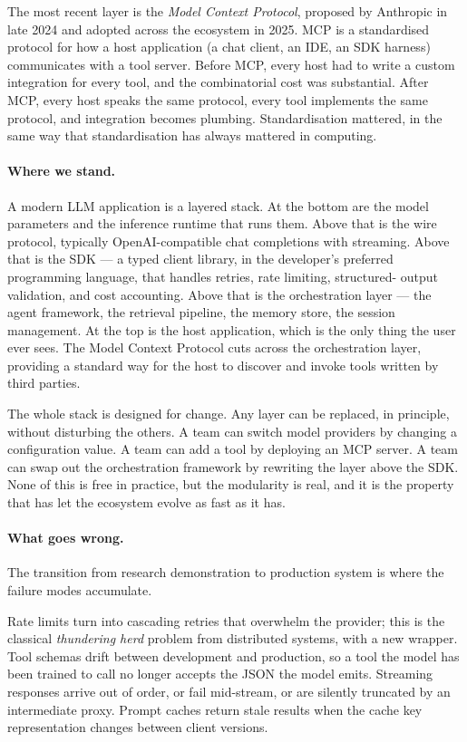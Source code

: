 The most recent layer is the \emph{Model Context Protocol},
proposed by Anthropic in late 2024 and adopted across the
ecosystem in 2025. MCP is a standardised protocol for how a
host application (a chat client, an IDE, an SDK harness)
communicates with a tool server. Before MCP, every host had
to write a custom integration for every tool, and the
combinatorial cost was substantial. After MCP, every host
speaks the same protocol, every tool implements the same
protocol, and integration becomes plumbing. Standardisation
mattered, in the same way that standardisation has always
mattered in computing.

\paragraph{Where we stand.} A modern LLM application is a layered stack. At the bottom are
the model parameters and the inference runtime that runs them.
Above that is the wire protocol, typically OpenAI-compatible
chat completions with streaming. Above that is the SDK --- a
typed client library, in the developer's preferred programming
language, that handles retries, rate limiting, structured-
output validation, and cost accounting. Above that is the
orchestration layer --- the agent framework, the retrieval
pipeline, the memory store, the session management. At the
top is the host application, which is the only thing the user
ever sees. The Model Context Protocol cuts across the
orchestration layer, providing a standard way for the host to
discover and invoke tools written by third parties.

The whole stack is designed for change. Any layer can be
replaced, in principle, without disturbing the others. A team
can switch model providers by changing a configuration value.
A team can add a tool by deploying an MCP server. A team can
swap out the orchestration framework by rewriting the layer
above the SDK. None of this is free in practice, but the
modularity is real, and it is the property that has let the
ecosystem evolve as fast as it has.

\paragraph{What goes wrong.} The transition from research demonstration to production
system is where the failure modes accumulate.

Rate limits turn into cascading retries that overwhelm the
provider; this is the classical \emph{thundering herd}
problem from distributed systems, with a new wrapper. Tool
schemas drift between development and production, so a tool
the model has been trained to call no longer accepts the JSON
the model emits. Streaming responses arrive out of order, or
fail mid-stream, or are silently truncated by an intermediate
proxy. Prompt caches return stale results when the cache key
representation changes between client versions.

